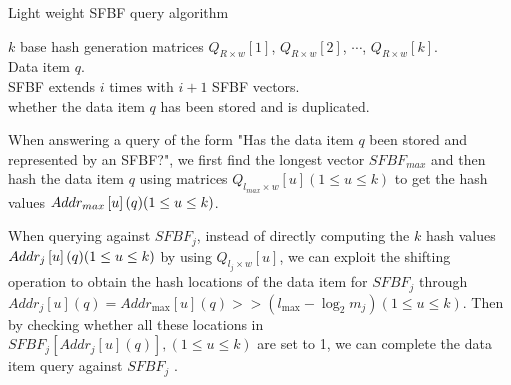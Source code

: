 \documentclass[10pt,journal,compsoc]{IEEEtran}
\begin{document}
\begin{algorithm}[h]
\caption{Light weight SFBF query algorithm}
\label{alg:Low cost query algorithm}
\begin{algorithmic}[1]
\small
\REQUIRE
$k$ base hash generation matrices ${Q_{R \times w}}[1]$, ${Q_{R \times w}}[2]$, $\cdots$, ${Q_{R \times w}}[k]$. \\
Data item $q$.\\
SFBF extends $i$ times with $i+1$ SFBF vectors.\\
\ENSURE
whether the data item $q$ has been stored and is duplicated.\\
\ENDFOR
\end{algorithmic}
\end{algorithm}

When answering a query of the form "Has the data item $q$ been stored and represented by an SFBF?", we first find the longest vector $SFBF_{max}$ and then hash the data item $q$ using matrices  ${Q_{l_{max} \times w}}\left[ u \right] \left( {1 \le u \le k} \right)$ to get the hash values $Add{r_{max}}\left[ u \right](q){\rm{ }}({\rm{1}} \le u \le k)$.

When querying against $SFBF_j$, instead of directly computing the $k$ hash values $Add{r_j}\left[ u \right](q){\rm{ }}({\rm{1}} \le u \le k)$ by using ${Q_{l_j \times w}}\left[ u \right]$, we can exploit the shifting operation to obtain the hash locations of the data item for $SFBF_j$ through $Add{r_j}\left[ u \right](q) = Add{r_{\max }}\left[ u \right] (q)>  > \left( {{l_{\max }} - {{\log }_2}{m_j}} \right)\left( {1 \le u \le k} \right)$.
Then by checking whether all these locations in $SFB{F_j}\left[ {Add{r_j}\left[ u \right](q)} \right],\left( {1 \le u \le k} \right)$ are set to 1, we can complete the data item query against $SFBF_j$ .
\end{document}
